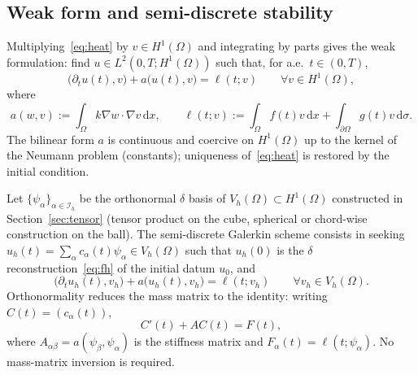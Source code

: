 \documentclass[final,3p,times]{elsarticle}
\theoremstyle{plain}
\theoremstyle{definition}
\theoremstyle{remark}
\newcommand{\dziti}{\ensuremath{\delta}\text{-Ziti}}
\newcommand{\dd}{\mathrm{d}}
\begin{document}
\subsection{Weak form and semi-discrete stability}

Multiplying~\eqref{eq:heat} by $v\in H^1(\Omega)$ and integrating by parts
gives the weak formulation: find
$u\in L^2(0,T;H^1(\Omega))$ such that, for a.e.\ $t\in(0,T)$,
\begin{equation}
\label{eq:weak}
\bigl(\partial_t u(t),v\bigr)
+a\bigl(u(t),v\bigr)
=\ell(t;v)
\qquad\forall v\in H^1(\Omega),
\end{equation}
where
\begin{equation}
\label{eq:forms}
a(w,v):=\int_\Omega k\nabla w\cdot\nabla v\,\dd x,
\qquad
\ell(t;v):=\int_\Omega f(t)v\,\dd x+\int_{\partial\Omega}g(t)v\,\dd\sigma.
\end{equation}
The bilinear form $a$ is continuous and coercive on $H^1(\Omega)$ up to the
kernel of the Neumann problem (constants); uniqueness of~\eqref{eq:heat} is
restored by the initial condition.

Let $\{\psi_\alpha\}_{\alpha\in\mathcal{I}_h}$ be the orthonormal \dziti{}
basis of $V_h(\Omega)\subset H^1(\Omega)$ constructed in
Section~\ref{sec:tensor} (tensor product on the cube, spherical or
chord-wise construction on the ball). The semi-discrete Galerkin scheme
consists in seeking $u_h(t)=\sum_{\alpha}c_\alpha(t)\psi_\alpha\in V_h(\Omega)$
such that $u_h(0)$ is the \dziti{} reconstruction~\eqref{eq:fh} of the
initial datum $u_0$, and
\begin{equation}
\label{eq:semidisc}
\bigl(\partial_t u_h(t),v_h\bigr)
+a\bigl(u_h(t),v_h\bigr)
=\ell(t;v_h)
\qquad\forall v_h\in V_h(\Omega).
\end{equation}
Orthonormality reduces the mass matrix to the identity: writing $C(t)=(c_\alpha(t))$,
\begin{equation}
\label{eq:ode}
C'(t)+AC(t)=F(t),
\end{equation}
where $A_{\alpha\beta}=a(\psi_\beta,\psi_\alpha)$ is the stiffness matrix and
$F_\alpha(t)=\ell(t;\psi_\alpha)$. No mass-matrix inversion is required.
\end{document}
